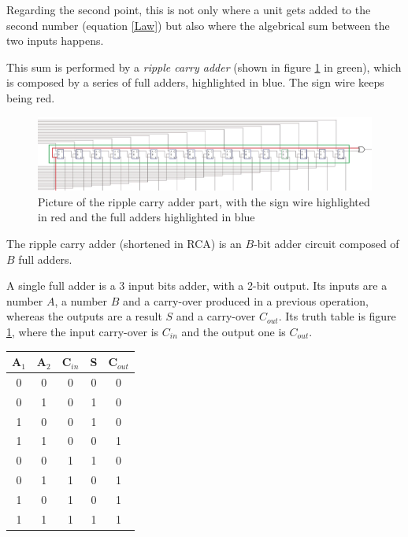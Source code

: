 \documentclass{article}
\begin{document}
Regarding the second point, this is not only where a unit gets added to the second number (equation \ref{Law}) but also where the algebrical sum between the two inputs happens.

This sum is performed by a \textit{ripple carry adder} (shown in figure \ref{RCA} in green), which is composed by a series of full adders, highlighted in blue. The sign wire keeps being red.

\begin{figure}[h]
  \centering
  \includegraphics[scale=0.43]{SC_Processing2.JPG}
  \caption{Picture of the ripple carry adder part, with the sign wire highlighted in red and the full adders highlighted in blue}
  \label{RCA}
\end{figure}

The ripple carry adder (shortened in RCA) is an $B$-bit adder circuit composed of $B$ full adders. 

A single full adder is a 3 input bits adder, with a 2-bit output. Its inputs are a number $A$, a number $B$ and a carry-over produced in a previous operation, whereas the outputs are a result $S$ and a carry-over $C_{out}$. Its truth table is figure \ref{FullAdder}, where the input carry-over is $C_{in}$ and the output one is $C_{out}$.

\begin{table}[h]
  \centering
  \begin{tabular}{|| c | c | c || c | c ||}
  \hline
  A$_1$ & A$_2$ & C$_{in}$ & S & C$_{out}$ \\ \hline
  0 & 0 & 0 & 0 & 0 \\ \hline
  0 & 1 & 0 & 1 & 0 \\ \hline
  1 & 0 & 0 & 1 & 0 \\ \hline
  1 & 1 & 0 & 0 & 1 \\ \hline
  0 & 0 & 1 & 1 & 0 \\ \hline
  0 & 1 & 1 & 0 & 1 \\ \hline
  1 & 0 & 1 & 0 & 1 \\ \hline
  1 & 1 & 1 & 1 & 1 \\ \hline
  \end{tabular}
  \label{FullAdder}
\end{table}
\end{document}
